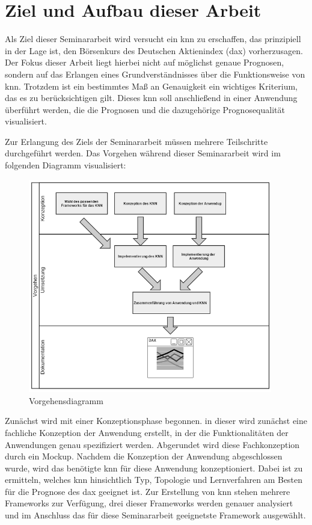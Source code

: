 \section{Ziel und Aufbau dieser Arbeit}
\label{section:Ziel}
Als Ziel dieser Seminararbeit wird versucht ein \ac{knn} zu erschaffen, das prinzipiell in der Lage ist, den Börsenkurs des Deutschen Aktienindex (\acs{dax}) vorherzusagen. Der Fokus dieser Arbeit liegt hierbei nicht auf möglichst genaue Prognosen, sondern auf das Erlangen eines Grundverständnisses über die Funktionsweise von \ac{knn}. Trotzdem ist ein bestimmtes Maß an Genauigkeit ein wichtiges Kriterium, das es zu berücksichtigen gilt. Dieses \ac{knn} soll anschließend in einer Anwendung überführt werden, die die Prognosen und die dazugehörige Prognosequalität visualisiert.

Zur Erlangung des Ziels der Seminararbeit müssen mehrere Teilschritte durchgeführt werden. Das Vorgehen während dieser Seminararbeit wird im folgenden Diagramm visualisiert:
 
\begin{figure}[htbp]
\centering
		\includegraphics[width=0.95\textwidth]{Vorgehensdiagramm.PNG}
	\caption{Vorgehensdiagramm}
	\label{fig:Vorgehensdiagramm}
\end{figure}

Zunächst wird mit einer Konzeptionsphase begonnen. in dieser wird zunächst eine fachliche Konzeption der Anwendung erstellt, in der die Funktionalitäten der Anwendungen genau spezifiziert werden. Abgerundet wird diese Fachkonzeption durch ein Mockup. Nachdem die Konzeption der Anwendung abgeschlossen wurde, wird das benötigte \ac{knn} für diese Anwendung konzeptioniert. Dabei ist zu ermitteln, welches \ac{knn} hinsichtlich Typ, Topologie und Lernverfahren am Besten für die Prognose des \ac{dax} geeignet ist. Zur Erstellung von \ac{knn} stehen mehrere Frameworks zur Verfügung, drei dieser Frameworks werden genauer analysiert und im Anschluss das für diese Seminararbeit geeignetste Framework ausgewählt.

